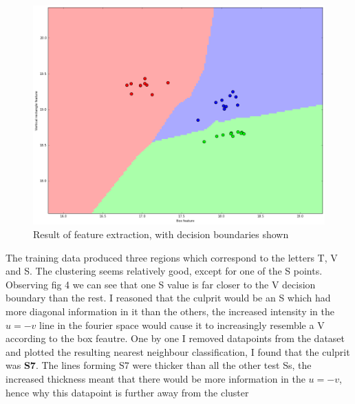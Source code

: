 \documentclass[a4paper,12px,twocolumn]{article}
\begin{document}
\begin{flushleft}
    \begin{figure}[h!]
      \caption{Result of feature extraction, with decision boundaries shown}
      \includegraphics[scale=0.25]{decision}
    \end{figure}



    The training data produced three regions which correspond to the letters T, V and S. The clustering seems relatively good, except for
    one of the S points. Observing fig 4 we can see that one S value is far closer to the V decision boundary than the rest. I reasoned that
    the culprit would be an S which had more diagonal information in it than the others, the increased intensity in the $u = -v$ line in the fourier
    space would cause it to increasingly resemble a V according to the box feautre. One by one I removed datapoints from the dataset and plotted the resulting nearest neighbour
    classification, I found that the culprit was \textbf{S7}. The lines forming S7 were thicker than all the other test Ss, the increased thickness
    meant that there would be more information in the $u=-v$, hence why this datapoint is further away from the cluster


\end{flushleft}
\end{document}
